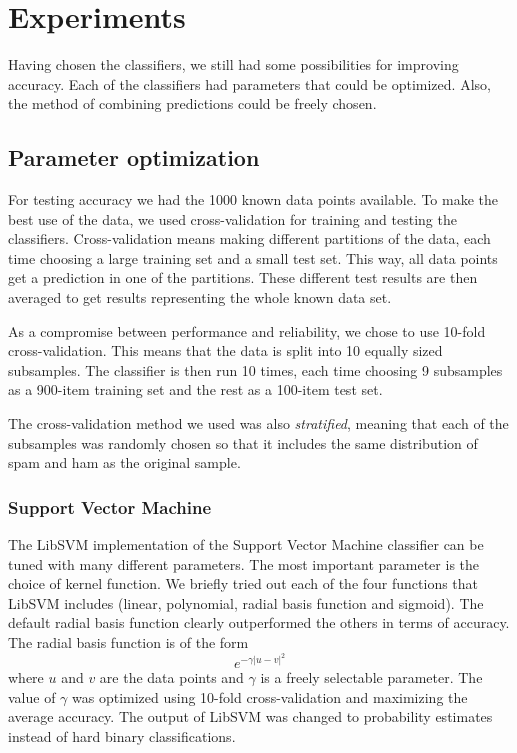 \section{Experiments}

Having chosen the classifiers, we still had some possibilities for
improving accuracy. Each of the classifiers had parameters that could be
optimized. Also, the method of combining predictions could be freely
chosen.

\subsection{Parameter optimization}

For testing accuracy we had the 1000 known data points available. To
make the best use of the data, we used cross-validation for training and
testing the classifiers. Cross-validation means making different
partitions of the data, each time choosing a large training set and a
small test set. This way, all data points get a prediction in one of the
partitions. These different test results are then averaged to get
results representing the whole known data set.

As a compromise between performance and reliability, we chose to use
10-fold cross-validation. This means that the data is split into 10
equally sized subsamples. The classifier is then run 10 times, each time
choosing 9 subsamples as a 900-item training set and the rest as a
100-item test set.

The cross-validation method we used was also \emph{stratified}, meaning
that each of the subsamples was randomly chosen so that it includes the
same distribution of spam and ham as the original sample.

\subsubsection{Support Vector Machine}

The LibSVM implementation of the Support Vector Machine classifier can
be tuned with many different parameters. The most important parameter is
the choice of kernel function. We briefly tried out each of the four
functions that LibSVM includes (linear, polynomial, radial basis
function and sigmoid). The default radial basis function clearly
outperformed the others in terms of accuracy. The radial basis function
is of the form
\begin{equation}
e^{-\gamma |u-v|^2}
\end{equation}
where $u$ and $v$ are the data points and $\gamma$ is a freely
selectable parameter. The value of $\gamma$ was optimized using 10-fold
cross-validation and maximizing the average accuracy. The output of
LibSVM was changed to probability estimates instead of hard binary
classifications.


